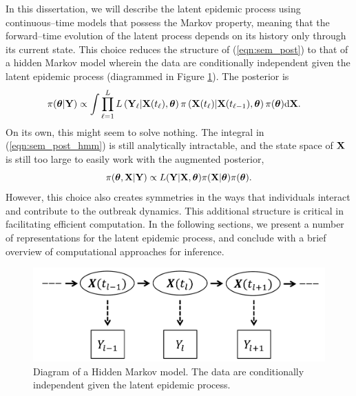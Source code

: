 In this dissertation, we will describe the latent epidemic process using continuous--time models that possess the Markov property, meaning that the forward--time evolution of the latent process depends on its history only through its current state. This choice reduces the structure of (\ref{eqn:sem_post}) to that of a hidden Markov model wherein the data are conditionally independent given the latent epidemic process (diagrammed in Figure \ref{fig:semhmm}). The  posterior is 
\begin{align}
\label{eqn:sem_post_hmm}
\pi(\boldsymbol{\theta}|\mathbf{Y}) &\propto\int \prod_{\ell = 1}^{L} L\left (\mathbf{Y}_\ell|\mathbf{X}(t_{\ell}),\boldsymbol{\theta}\right ) \pi\left (\mathbf{X}(t_\ell)|\mathbf{X}(t_{\ell-1}),\boldsymbol{\theta}\right )\pi(\boldsymbol{\theta})\mathrm{d}\mathbf{X}.
\end{align}
On its own, this might seem to solve nothing. The integral in (\ref{eqn:sem_post_hmm}) is still analytically intractable, and the state space of $ \mathbf{X} $ is still too large to easily work with the augmented posterior, 
\begin{equation}
\pi(\boldsymbol{\theta},\mathbf{X}|\mathbf{Y})\propto L(\mathbf{Y}|\mathbf{X},\boldsymbol{\theta})\pi(\mathbf{X}|\boldsymbol{\theta})\pi(\boldsymbol{\theta}).
\end{equation}
However, this choice also creates symmetries in the ways that individuals interact and contribute to the outbreak dynamics. This additional structure is critical in facilitating efficient computation. In the following sections, we present a number of representations for the latent epidemic process, and conclude with a brief overview of computational approaches for inference.  

\begin{figure}[htbp]
	\centering
	\includegraphics[width=0.5\linewidth]{figures/SEM_HMM}
	\caption[Diagram of a Hidden Markov model.]{Diagram of a Hidden Markov model. The data are conditionally independent given the latent epidemic process.}
	\label{fig:semhmm}
\end{figure}


